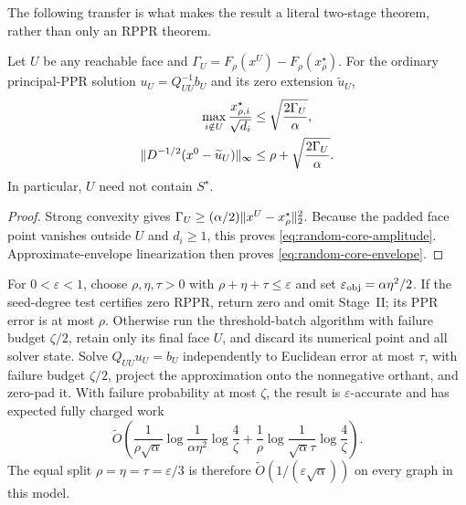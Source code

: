 The following transfer is what makes the result a literal two-stage theorem,
rather than only an RPPR theorem.

\begin{lemma}
\label{lem:random-core-inner-face}
Let $U$ be any reachable face and
$\Gamma_U=F_\rho(x^U)-F_\rho(x_\rho^\star)$.  For the ordinary principal-PPR
solution $u_U=Q_{UU}^{-1}b_U$ and its zero extension $\widetilde u_U$,
\begin{align}
 \max_{i\notin U}\frac{x_{\rho,i}^\star}{\sqrt{d_i}}
 &\leq\sqrt{\frac{2\Gamma_U}{\alpha}},
 \label{eq:random-core-amplitude}\\
 \lVert D^{-1/2}(x^0-\widetilde u_U)\rVert_\infty
 &\leq\rho+\sqrt{\frac{2\Gamma_U}{\alpha}}.
 \label{eq:random-core-envelope}
\end{align}
In particular, $U$ need not contain $S^\star$.
\end{lemma}

\begin{proof}
Strong convexity gives
$\Gamma_U\geq(\alpha/2)\lVert x^U-x_\rho^\star\rVert_2^2$.
Because the padded face point vanishes outside $U$ and $d_i\geq1$, this
proves \cref{eq:random-core-amplitude}.  Approximate-envelope linearization
then proves \cref{eq:random-core-envelope}.
\end{proof}

\begin{theorem}
\label{thm:random-core-two-stage}
For $0<\varepsilon<1$, choose $\rho,\eta,\tau>0$ with
$\rho+\eta+\tau\leq\varepsilon$ and set
$\varepsilon_{\rm obj}=\alpha\eta^2/2$.  If the seed-degree test certifies
zero RPPR, return zero and omit Stage~II; its PPR error is at most $\rho$.
Otherwise run the threshold-batch algorithm
with failure budget $\zeta/2$, retain only its final face $U$, and discard its
numerical point and all solver state.  Solve $Q_{UU}u_U=b_U$ independently to
Euclidean error at most $\tau$, with failure budget $\zeta/2$, project the
approximation onto the nonnegative orthant, and zero-pad it.  With failure
probability at most $\zeta$, the result is $\varepsilon$-accurate and has
expected fully charged work
\begin{equation}
 \widetilde O\!\left(
  \frac{1}{\rho\sqrt\alpha}\log\frac1{\alpha\eta^2}
      \log\frac4\zeta
  +\frac1\rho\log\frac1{\sqrt\alpha\tau}\log\frac4\zeta
 \right).
 \label{eq:random-core-total-work}
\end{equation}
The equal split $\rho=\eta=\tau=\varepsilon/3$ is therefore
$\widetilde O(1/(\varepsilon\sqrt\alpha))$ on every graph in this model.
\end{theorem}

